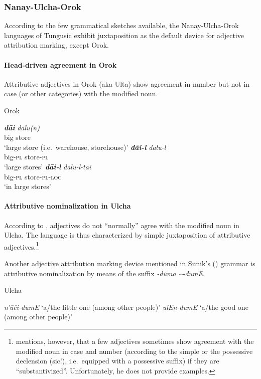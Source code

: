 \subsubsection{Nanay-Ulcha-Orok}
According to the few grammatical sketches available, the Nanay-Ulcha-Orok languages of Tungusic exhibit juxtaposition as the default device for adjective attribution marking, except Orok.

\paragraph{Head-driven agreement in Orok}
Attributive adjectives in Orok (aka Ulta) show agreement in number but not in case (or other categories) with the modified noun.
\begin{exe}
\ex 
\rm{Orok \citep[55]{petrova1967}}
\begin{xlist}
\ex
\gll \textit{\textbf{dāi}} \textit{dalu(n)}\\
	big store\\
\glt ‘large store (i.e.~warehouse, storehouse)’
\ex 
\gll	\textit{\textbf{dāi-l}} \textit{dalu-l}\\
	big-\textsc{pl} store-\textsc{pl}\\
\glt	‘large stores’
\ex 
\gll	\textit{\textbf{dāi-l}} \textit{dalu-l-tai}\\
	big-\textsc{pl} store-\textsc{pl}-\textsc{loc}\\
\glt	‘in large stores’
\end{xlist}
\end{exe}

\paragraph{Attributive nominalization in Ulcha}
According to \citet[36, 52–53]{sunik1985}, adjectives do not “normally” agree with the modified noun in Ulcha. The language is thus characterized by simple juxtaposition of attributive adjectives.\footnote{\citet[36]{sunik1985} mentions, however, that a few adjectives sometimes show agreement with the modified noun in case and number (according to the simple or the possessive declension (sic!), i.e.~equipped with a possessive suffix) if they are “substantivized”. Unfortunately, he does not provide examples.}

Another adjective attribution marking device mentioned in Sunik's (\citeyear{sunik1985}) grammar is attributive nominalization by means of the suffix \textit{-d\.uma \textasciitilde-dumE}.
\begin{exe}
\ex 
\rm{Ulcha \citep[38]{sunik1985}}
\begin{xlist}
\ex \textit{n'ūči-dumE} \rm{‘a/the little one (among other people)’}
\ex \textit{ulEn-dumE} \rm{‘a/the good one (among other people)’}
\end{xlist}
\end{exe}

